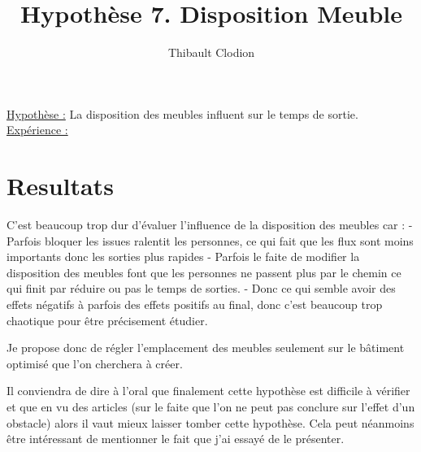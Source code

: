 \documentclass[12pt]{article}
\title{Hypothèse 7. Disposition Meuble}
\author{Thibault Clodion}
\begin{document}
\maketitle %

\underline{Hypothèse :} La disposition des meubles influent sur le temps de sortie.
\newline\newline
\underline{Expérience :}
\newline


\section{Resultats}

C'est beaucoup trop dur d'évaluer l'influence de la disposition des meubles car :
\newline - Parfois bloquer les issues ralentit les personnes, ce qui fait que les flux sont moins importants donc les sorties plus rapides
\newline - Parfois le faite de modifier la disposition des meubles font que les personnes ne passent plus par le chemin ce qui finit par réduire ou pas le temps de sorties.
\newline - Donc ce qui semble avoir des effets négatifs à parfois des effets positifs au final, donc c'est beaucoup trop chaotique pour être précisement étudier.
\newline\newline

Je propose donc de régler l'emplacement des meubles seulement sur le bâtiment optimisé que l'on cherchera à créer.
\newline\newline

Il conviendra de dire à l'oral que finalement cette hypothèse est difficile à vérifier et que en vu des articles (sur le faite que l'on ne peut pas conclure sur l'effet d'un obstacle)
alors il vaut mieux laisser tomber cette hypothèse. Cela peut néanmoins être intéressant de mentionner le fait que j'ai essayé de le présenter.
\end{document}
